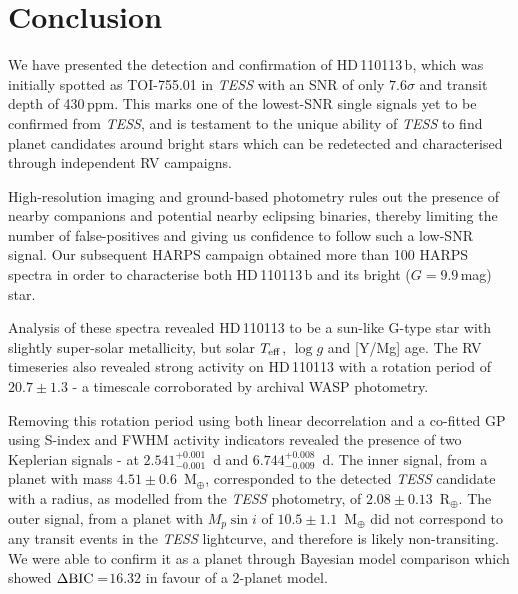 \documentclass[fleqn,usenatbib]{mnras}
\newcommand{\tess}{{\it TESS}}
\newcommand{\harps}{{HARPS}}
\newcommand{\rearth}{R$_{\oplus}$}
\newcommand{\mearth}{M$_{\oplus}$}
\newcommand{\teff}{$T_{\rm eff}$}
\newcommand{\logg}{$\log g$}
\newcommand{\TPzero}{ $ 2.541^{+0.001}_{-0.001} $ }
\newcommand{\TPone}{ $ 6.744^{+0.008}_{-0.009} $ }
\newcommand{\TMpzero}{ $ 4.51 \pm 0.6 $ }
\newcommand{\TMpone}{ $ 10.5 \pm 1.1 $ }
\newcommand{\Trpl}{ $ 2.08 \pm 0.13 $ }
\newcommand{\Tperiod}{ $ 20.7 \pm 1.3 $ }
\newcommand{\TTplanet}{TOI-755.01}
\newcommand{\Tstar}{HD\,110113}
\newcommand{\Tplanet}{HD\,110113\,b}
\newcommand{\TdeltaBIC}{$16.32$}
\begin{document}

\section{Conclusion}
We have presented the detection and confirmation of \Tplanet{}, which was initially spotted as \TTplanet{} in \tess{} with an SNR of only $7.6\sigma$ and transit depth of 430\,ppm.
This marks one of the lowest-SNR single signals yet to be confirmed from \tess{}, and is testament to the unique ability of \tess{} to find planet candidates around bright stars which can be redetected and characterised through independent RV campaigns.

High-resolution imaging and ground-based photometry rules out the presence of nearby companions and potential nearby eclipsing binaries, thereby limiting the number of false-positives and giving us confidence to follow such a low-SNR signal.
Our subsequent HARPS campaign obtained more than 100 \harps{} spectra in order to characterise both \Tplanet{} and its bright ($G=9.9$\,mag) star.

Analysis of these spectra revealed \Tstar{} to be a sun-like G-type star with slightly super-solar metallicity, but solar \teff{}, \logg{} and [Y/Mg] age.
The RV timeseries also revealed strong activity on \Tstar{} with a rotation period of \Tperiod{} - a timescale corroborated by archival WASP photometry.

Removing this rotation period using both linear decorrelation and a co-fitted GP using S-index and FWHM activity indicators revealed the presence of two Keplerian signals - at \TPzero{}\,d and \TPone{}\,d.
The inner signal, from a planet with mass \TMpzero{}\,\mearth{}, corresponded to the detected \tess{} candidate with a radius, as modelled from the \tess{} photometry, of \Trpl{}\,\rearth{}.
The outer signal, from a planet with $M_p\sin{i}$ of \TMpone{}\,\mearth{} did not correspond to any transit events in the \tess{} lightcurve, and therefore is likely non-transiting.
We were able to confirm it as a planet through Bayesian model comparison which showed $\Delta{\rm BIC}= $\TdeltaBIC{} in favour of a 2-planet model.
\end{document}
